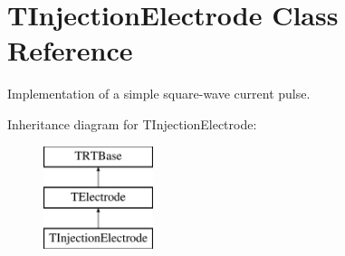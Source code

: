 \hypertarget{class_t_injection_electrode}{\section{T\+Injection\+Electrode Class Reference}
\label{class_t_injection_electrode}
}


Implementation of a simple square-\/wave current pulse.  


Inheritance diagram for T\+Injection\+Electrode\+:\begin{figure}[H]
\begin{center}
\leavevmode
\includegraphics[height=3.000000cm]{class_t_injection_electrode}
\end{center}
\end{figure}
